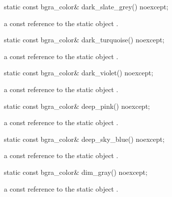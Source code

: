 \begin{itemdecl}
static const bgra_color& dark_slate_grey() noexcept;
\end{itemdecl}
\begin{itemdescr}
\pnum
\returns
a const reference to the static  object .
\end{itemdescr}

\begin{itemdecl}
static const bgra_color& dark_turquoise() noexcept;
\end{itemdecl}
\begin{itemdescr}
\pnum
\returns
a const reference to the static  object .
\end{itemdescr}

\begin{itemdecl}
static const bgra_color& dark_violet() noexcept;
\end{itemdecl}
\begin{itemdescr}
\pnum
\returns
a const reference to the static  object .
\end{itemdescr}

\begin{itemdecl}
static const bgra_color& deep_pink() noexcept;
\end{itemdecl}
\begin{itemdescr}
\pnum
\returns
a const reference to the static  object .
\end{itemdescr}

\begin{itemdecl}
static const bgra_color& deep_sky_blue() noexcept;
\end{itemdecl}
\begin{itemdescr}
\pnum
\returns
a const reference to the static  object .
\end{itemdescr}

\begin{itemdecl}
static const bgra_color& dim_gray() noexcept;
\end{itemdecl}
\begin{itemdescr}
\pnum
\returns
a const reference to the static  object .
\end{itemdescr}

